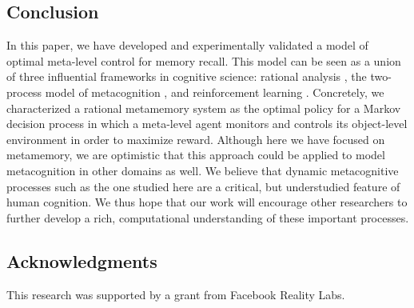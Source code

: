 \subsection{Conclusion}

In this paper, we have developed and experimentally validated a model of optimal meta-level control for memory recall. This model can be seen as a union of three influential frameworks in cognitive science: rational analysis \citep{anderson1990adaptive}, the two-process model of metacognition \citepnelson{}, and reinforcement learning \citep{dayan2008decision}. Concretely, we characterized a rational metamemory system as the optimal policy for a Markov decision process in which a meta-level agent monitors and controls its object-level environment in order to maximize reward. Although here we have focused on metamemory, we are optimistic that this approach could be applied to model metacognition in other domains as well. We believe that dynamic metacognitive processes such as the one studied here are a critical, but understudied feature of human cognition. We thus hope that our work will encourage other researchers to further develop a rich, computational understanding of these important processes.


\subsection*{Acknowledgments}
This research was supported by a grant from Facebook Reality Labs.

